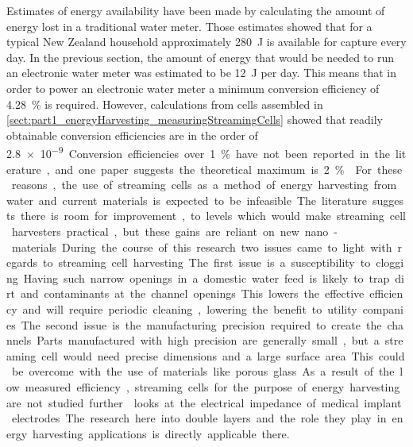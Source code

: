 
Estimates of energy availability have been made by calculating the amount of energy lost in a traditional water meter.
Those estimates showed that for a typical New Zealand household approximately \SI{280}{\joule} is available for capture every day.
In the previous section, the amount of energy that would be needed to run an electronic water meter was estimated to be \SI{12}{\joule} per day.
This means that in order to power an electronic water meter a minimum conversion efficiency of \SI{4.28}{\percent} is required.
However, calculations from cells assembled in \cref{sect:part1_energyHarvesting_measuringStreamingCells} showed that readily obtainable conversion efficiencies are in the order of \SI{2.8e-9}.
Conversion efficiencies over \SI{1}{\percent} have not been reported in the literature, and one paper suggests the theoretical maximum is \SI{2}{\percent} \cite{VanderHeyden2006}.
For these reasons, the use of streaming cells as a method of energy harvesting from water and current materials is expected to be infeasible.
The literature suggests there is room for improvement, to levels which would make streaming cell harvesters practical, but these gains are reliant on new nano-materials.

During the course of this research two issues came to light with regards to streaming cell harvesting.
The first issue is a susceptibility to clogging.
Having such narrow openings in a domestic water feed is likely to trap dirt and contaminants at the channel openings.
This lowers the effective efficiency and will require periodic cleaning, lowering the benefit to utility companies.
The second issue is the manufacturing precision required to create the channels.
Parts manufactured with high precision are generally small, but a streaming cell would need precise dimensions and a large surface area.
This could be overcome with the use of materials like porous glass.
As a result of the low measured efficiency, streaming cells for the purpose of energy harvesting are not studied further.
 looks at the electrical impedance of medical implant electrodes.
The research here into double layers and the role they play in energy harvesting applications is directly applicable there.

